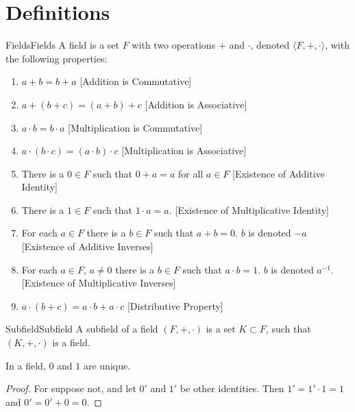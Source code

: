 \section{Definitions}
    \begin{fdefinition}{Fields}{Fields}
        A field is a set $F$ with two operations $+$ and $\cdot$, denoted $\langle F, +,\cdot \rangle$, with the following properties:
        \begin{enumerate}
            \item   $a+b=b+a$
                    \hfill[Addition is Commutative]
            \item   $a+(b+c)=(a+b)+c$
                    \hfill[Addition is Associative]
            \item   $a\cdot{b}=b\cdot{a}$
                    \hfill[Multiplication is Commutative]
            \item   $a\cdot(b\cdot{c})=(a\cdot{b})\cdot{c}$
                    \hfill[Multiplication is Associative]
            \item   There is a $0\in{F}$ such that $0+a=a$ for all $a\in{F}$
                    \hfill[Existence of Additive Identity]
            \item   There is a $1\in{F}$ such that $1\cdot{a}=a$.
                    \hfill [Existence of Multiplicative Identity]
            \item   For each $a\in{F}$ there is a $b\in{F}$ such that $a+b=0$.
                    $b$ is denoted $\minus{a}$
                    \hfill[Existence of Additive Inverses]
            \item   For each $a\in{F}$, $a\ne{0}$ there is a $b\in{F}$ such that
                    $a\cdot{b}=1$. $b$ is denoted $a^{\minus{1}}$.
                    \hfill[Existence of Multiplicative Inverses]
            \item   $a\cdot(b+c)=a\cdot{b}+a\cdot{c}$
                    \hfill[Distributive Property]
        \end{enumerate}
    \end{fdefinition}
    \begin{fdefinition}{Subfield}{Subfield}
        A subfield of a field $(F,+,\cdot)$ is a set $K\subset F$, such that
        $(K,+,\cdot)$ is a field.
    \end{fdefinition}
    \begin{theorem}
        In a field, $0$ and $1$ are unique.
    \end{theorem}
    \begin{proof}
        For suppose not, and let $0'$ and $1'$ be other identities.
        Then $1'=1'\cdot 1 = 1$ and $0'=0'+0=0$.
    \end{proof}
